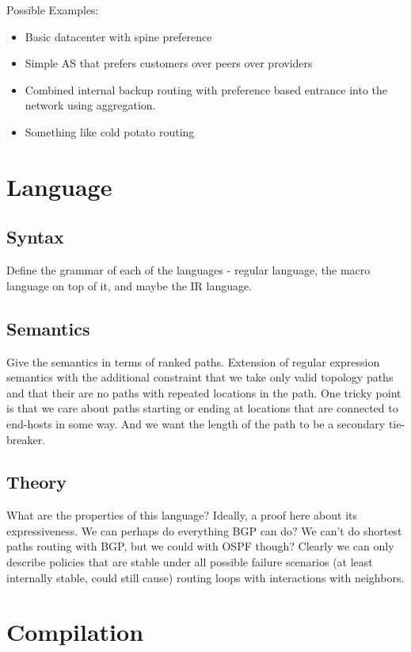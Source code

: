 \documentclass{paper}
\begin{document}
Possible Examples:
\begin{itemize}
	\item Basic datacenter with spine preference
	\item Simple AS that prefers customers over peers over providers
	\item Combined internal backup routing with preference based entrance into the network using aggregation.
	\item Something like cold potato routing
\end{itemize}

\section{Language}

\subsection{Syntax}
Define the grammar of each of the languages - regular language, the macro language on top of it, and maybe the IR language.

\subsection{Semantics}
Give the semantics in terms of ranked paths.
Extension of regular expression semantics with the
additional constraint that we take only valid topology paths and that their are no paths with
repeated locations in the path. One tricky point is that we care about paths starting or ending at locations that are
connected to end-hosts in some way. And we want the length of the path to be a secondary tie-breaker.

\subsection{Theory}
What are the properties of this language? Ideally, a proof here about its expressiveness. We can perhaps do everything
BGP can do? We can't do shortest paths routing with BGP, but we could with OSPF though? Clearly we can only describe
policies that are stable under all possible failure scenarios (at least internally stable, could still cause) routing
loops with interactions with neighbors.


\section{Compilation}
\end{document}
